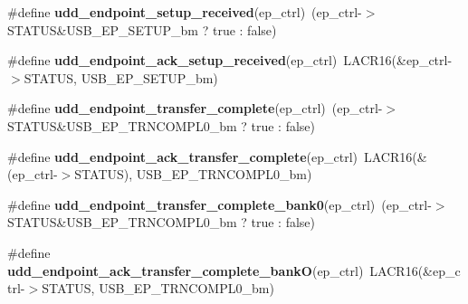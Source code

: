 \begin{DoxyCompactItemize}
\item 
\hypertarget{group__udd__xmega__usb__group_ga226c81deb98287812f6220f869cdb15c}{\#define {\bfseries udd\-\_\-endpoint\-\_\-setup\-\_\-received}(ep\-\_\-ctrl)~(ep\-\_\-ctrl-\/$>$S\-T\-A\-T\-U\-S\&U\-S\-B\-\_\-\-E\-P\-\_\-\-S\-E\-T\-U\-P\-\_\-bm ? true \-: false)}\label{group__udd__xmega__usb__group_ga226c81deb98287812f6220f869cdb15c}

\item 
\hypertarget{group__udd__xmega__usb__group_ga39ebaa42cd780ded107b3e3197bfda76}{\#define {\bfseries udd\-\_\-endpoint\-\_\-ack\-\_\-setup\-\_\-received}(ep\-\_\-ctrl)~L\-A\-C\-R16(\&ep\-\_\-ctrl-\/$>$S\-T\-A\-T\-U\-S, U\-S\-B\-\_\-\-E\-P\-\_\-\-S\-E\-T\-U\-P\-\_\-bm)}\label{group__udd__xmega__usb__group_ga39ebaa42cd780ded107b3e3197bfda76}

\item 
\hypertarget{group__udd__xmega__usb__group_gaa286d5f9c879328dd67dab4293bc0d19}{\#define {\bfseries udd\-\_\-endpoint\-\_\-transfer\-\_\-complete}(ep\-\_\-ctrl)~(ep\-\_\-ctrl-\/$>$S\-T\-A\-T\-U\-S\&U\-S\-B\-\_\-\-E\-P\-\_\-\-T\-R\-N\-C\-O\-M\-P\-L0\-\_\-bm ? true \-: false)}\label{group__udd__xmega__usb__group_gaa286d5f9c879328dd67dab4293bc0d19}

\item 
\hypertarget{group__udd__xmega__usb__group_ga80a968af11220a0382a7e9081466a7ae}{\#define {\bfseries udd\-\_\-endpoint\-\_\-ack\-\_\-transfer\-\_\-complete}(ep\-\_\-ctrl)~L\-A\-C\-R16(\&(ep\-\_\-ctrl-\/$>$S\-T\-A\-T\-U\-S), U\-S\-B\-\_\-\-E\-P\-\_\-\-T\-R\-N\-C\-O\-M\-P\-L0\-\_\-bm)}\label{group__udd__xmega__usb__group_ga80a968af11220a0382a7e9081466a7ae}

\item 
\hypertarget{group__udd__xmega__usb__group_ga8ad7a27d331e45cb93336c3f41418983}{\#define {\bfseries udd\-\_\-endpoint\-\_\-transfer\-\_\-complete\-\_\-bank0}(ep\-\_\-ctrl)~(ep\-\_\-ctrl-\/$>$S\-T\-A\-T\-U\-S\&U\-S\-B\-\_\-\-E\-P\-\_\-\-T\-R\-N\-C\-O\-M\-P\-L0\-\_\-bm ? true \-: false)}\label{group__udd__xmega__usb__group_ga8ad7a27d331e45cb93336c3f41418983}

\item 
\hypertarget{group__udd__xmega__usb__group_ga7a85ef2804cc6663c84069e1d5dc6926}{\#define {\bfseries udd\-\_\-endpoint\-\_\-ack\-\_\-transfer\-\_\-complete\-\_\-bank\-O}(ep\-\_\-ctrl)~L\-A\-C\-R16(\&ep\-\_\-ctrl-\/$>$S\-T\-A\-T\-U\-S, U\-S\-B\-\_\-\-E\-P\-\_\-\-T\-R\-N\-C\-O\-M\-P\-L0\-\_\-bm)}\label{group__udd__xmega__usb__group_ga7a85ef2804cc6663c84069e1d5dc6926}


\end{DoxyCompactItemize}
